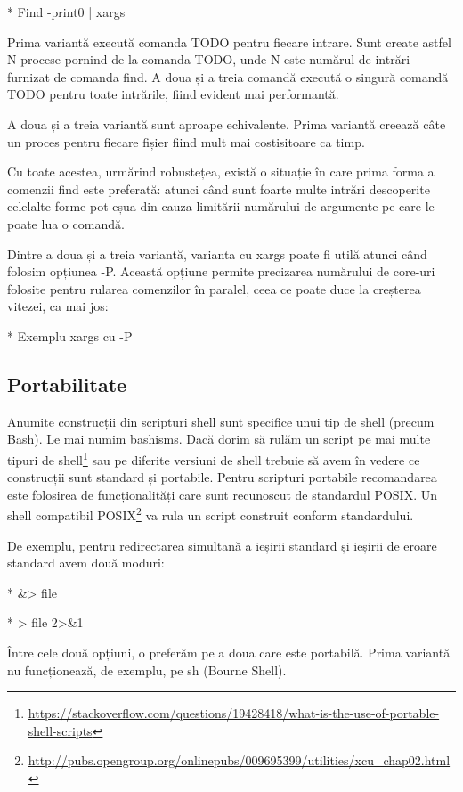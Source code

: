 * Find -print0 | xargs

Prima variantă execută comanda TODO pentru fiecare intrare. Sunt create astfel N
procese pornind de la comanda TODO, unde N este numărul de intrări furnizat de
comanda find. A doua și a treia comandă execută o singură comandă TODO pentru
toate intrările, fiind evident mai performantă.

A doua și a treia variantă sunt aproape echivalente. Prima variantă creează câte
un proces pentru fiecare fișier fiind mult mai costisitoare ca timp.

\begin{note}[NOTĂ]
Cu toate acestea, urmărind robustețea, există o situație în care prima
forma a comenzii find este preferată: atunci când sunt foarte multe
intrări descoperite celelalte forme pot eșua din cauza limitării
numărului de argumente pe care le poate lua o comandă.
\end{note}

Dintre a doua și a treia variantă, varianta cu xargs poate fi utilă atunci când
folosim opțiunea -P. Această opțiune permite precizarea numărului de core-uri
folosite pentru rularea comenzilor în paralel, ceea ce poate duce la creșterea
vitezei, ca mai jos:

* Exemplu xargs cu -P

\subsection{Portabilitate}

Anumite construcții din scripturi shell sunt specifice unui tip de shell (precum
Bash). Le mai numim bashisms. Dacă dorim să rulăm un script pe mai multe tipuri
de
shell\footnote{\url{https://stackoverflow.com/questions/19428418/what-is-the-use-of-portable-shell-scripts}}
sau pe diferite versiuni de shell trebuie să avem în vedere ce construcții sunt
standard și portabile. Pentru scripturi portabile recomandarea este folosirea de
funcționalități care sunt recunoscut de standardul POSIX. Un shell compatibil
POSIX\footnote{\url{http://pubs.opengroup.org/onlinepubs/009695399/utilities/xcu_chap02.html}}
va rula un script construit conform standardului.

De exemplu, pentru redirectarea simultană a ieșirii standard și ieșirii de
eroare standard avem două moduri:

* \&> file

* > file 2>\&1

Între cele două opțiuni, o preferăm pe a doua care este portabilă. Prima
variantă nu funcționează, de exemplu, pe sh (Bourne Shell).

